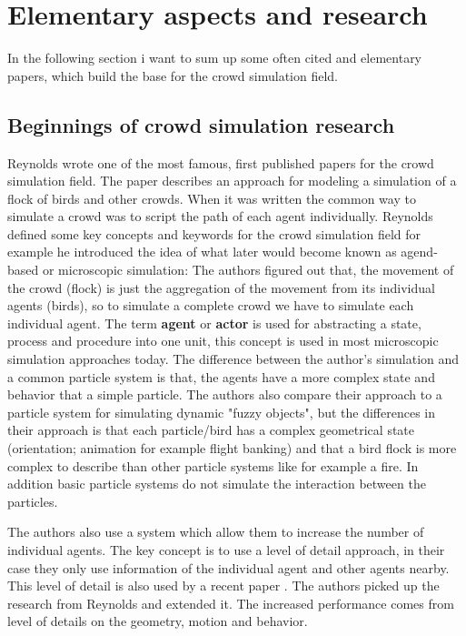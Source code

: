 \documentclass{acmsiggraph}               %
\begin{document}
\section{Elementary aspects and research}
\label{chapter:elementaryPapers}
In the following section i want to sum up some often cited and elementary papers, which build the base for the crowd simulation field.
\subsection{Beginnings of crowd simulation research}

Reynolds  wrote one of the most famous, first published papers for the crowd simulation field. The paper describes an approach for modeling a simulation of a flock of birds and other crowds. When it was written the common way to simulate a crowd was to script the path of each agent individually. Reynolds defined some key concepts and keywords for the crowd simulation field for example he introduced the idea of what later would become known as agend-based or microscopic simulation: The authors figured out that, the movement of the crowd (flock) is just the aggregation of the movement from its individual agents (birds), so to simulate a complete crowd we have to simulate each individual agent.
The term \textbf{agent} or \textbf{actor} is used for abstracting a state, process and procedure into one unit, this concept is used in most microscopic simulation approaches today. The difference between the author's simulation and a common particle system is that, the agents have a more complex state and behavior that a simple particle.
The authors also compare their approach to a particle system for simulating dynamic "fuzzy objects", but the differences in their approach is that each particle/bird has a complex geometrical state (orientation; animation for example flight banking) and that a bird flock is more complex to describe than other particle systems like for example a fire. In addition basic particle systems do not simulate the interaction between the particles.

The authors also use a system which allow them to increase the number of individual agents. The key concept is to use a level of detail approach, in their case they only use information of the individual agent and other agents nearby. This level of detail is also used by a recent paper \cite{osullivan_levels_2002}. The authors picked up the research from Reynolds and extended it. The increased performance comes from level of details on the geometry, motion and behavior.
\end{document}
